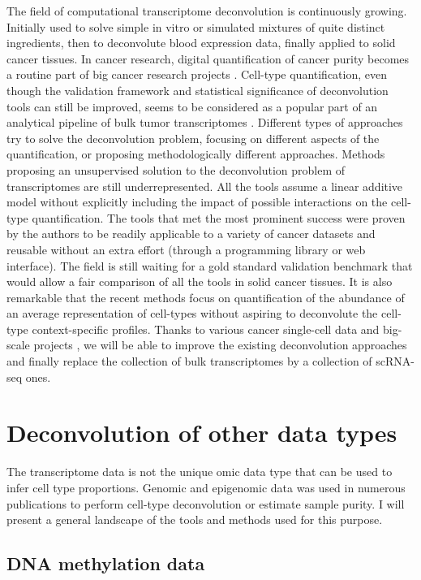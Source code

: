 \documentclass[12pt,]{book}
\theoremstyle{definition}
\theoremstyle{definition}
\theoremstyle{definition}
\theoremstyle{remark}
\begin{document}
The field of computational transcriptome deconvolution is continuously
growing. Initially used to solve simple in vitro or simulated mixtures
of quite distinct ingredients, then to deconvolute blood expression
data, finally applied to solid cancer tissues. In cancer research,
digital quantification of cancer purity becomes a routine part of big
cancer research projects \citep{Yoshihara2013}. Cell-type
quantification, even though the validation framework and statistical
significance of deconvolution tools can still be improved, seems to be
considered as a popular part of an analytical pipeline of bulk tumor
transcriptomes \citep{Cieslik2017}. Different types of approaches try to
solve the deconvolution problem, focusing on different aspects of the
quantification, or proposing methodologically different approaches.
Methods proposing an unsupervised solution to the deconvolution problem
of transcriptomes are still underrepresented. All the tools assume a
linear additive model without explicitly including the impact of
possible interactions on the cell-type quantification. The tools that
met the most prominent success were proven by the authors to be readily
applicable to a variety of cancer datasets and reusable without an extra
effort (through a programming library or web interface). The field is
still waiting for a gold standard validation benchmark that would allow
a fair comparison of all the tools in solid cancer tissues. It is also
remarkable that the recent methods focus on quantification of the
abundance of an average representation of cell-types without aspiring to
deconvolute the cell-type context-specific profiles. Thanks to various
cancer single-cell data and big-scale projects \citep{Regev2017}, we
will be able to improve the existing deconvolution approaches and
finally replace the collection of bulk transcriptomes by a collection of
scRNA-seq ones.

\hypertarget{otherDecon}{%
\section{Deconvolution of other data types}\label{otherDecon}}

The transcriptome data is not the unique omic data type that can be used
to infer cell type proportions. Genomic and epigenomic data was used in
numerous publications to perform cell-type deconvolution or estimate
sample purity. I will present a general landscape of the tools and
methods used for this purpose.

\hypertarget{dna-methylation-data}{%
\subsection{DNA methylation data}\label{dna-methylation-data}}
\end{document}
